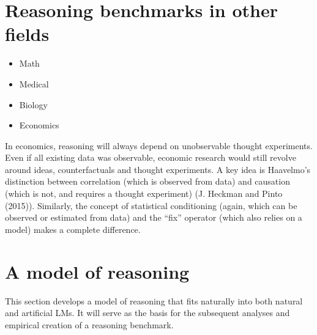 \documentclass[
]{article}
\begin{document}
\section{Reasoning benchmarks in other
fields}\label{reasoning-benchmarks-in-other-fields}

\begin{itemize}
\item
  Math
\item
  Medical
\item
  Biology
\item
  Economics
\end{itemize}

In economics, reasoning will always depend on unobservable thought
experiments. Even if all existing data was observable, economic research
would still revolve around ideas, counterfactuals and thought
experiments. A key idea is Haavelmo's distinction between correlation
(which is observed from data) and causation (which is not, and requires
a thought experiment) (J. Heckman and Pinto (2015)). Similarly, the
concept of statistical conditioning (again, which can be observed or
estimated from data) and the ``fix'' operator (which also relies on a
model) makes a complete difference.

\section{A model of reasoning}\label{a-model-of-reasoning}

This section develops a model of reasoning that fits naturally into both
natural and artificial LMs. It will serve as the basis for the
subsequent analyses and empirical creation of a reasoning benchmark.
\end{document}
